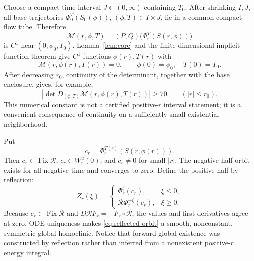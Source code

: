 \documentclass[11pt,reqno]{amsart}
\numberwithin{equation}{section}
\theoremstyle{remark}
\newcommand{\Fix}{\operatorname{Fix}}
\newcommand{\cR}{\mathcal R}
\newcommand{\cM}{\mathcal M}
\begin{document}
Choose a compact time interval $J\Subset(0,\infty)$ containing $T_0$.
After shrinking $I,J$, all base trajectories
$\Phi_0^T(S_0(\phi))$, $(\phi,T)\in I\times J$, lie in a common compact
flow tube.  Therefore
\begin{equation}\label{eq:matching-map}
 \cM(r,\phi,T)=(P,Q)\bigl(\Phi_r^T(S(r,\phi))\bigr)
\end{equation}
is $C^1$ near $(0,\phi_0,T_0)$.  Lemma~\ref{lem:core} and the
finite-dimensional implicit-function theorem give $C^1$ functions
$\phi(r),T(r)$ with
\begin{equation}\label{eq:implicit-branch}
 \cM(r,\phi(r),T(r))=0,
 \qquad \phi(0)=\phi_0,\quad T(0)=T_0.
\end{equation}
After decreasing $r_0$, continuity of the determinant, together with the
base enclosure, gives, for example,
\begin{equation}\label{eq:continued-det-bound}
 \left|\det D_{(\phi,T)}\cM(r,\phi(r),T(r))\right|\ge70
 \qquad(|r|\le r_0).
\end{equation}
This numerical constant is not a certified positive-$r$ interval statement;
it is a convenient consequence of continuity on a sufficiently small
existential neighborhood.

Put
\begin{equation}\label{eq:center-cr}
 c_r=\Phi_r^{T(r)}(S(r,\phi(r))).
\end{equation}
Then $c_r\in\Fix\cR$, $c_r\in W^u_r(0)$, and $c_r\ne0$ for small $|r|$.
The negative half-orbit exists for all negative time and converges to zero.
Define the positive half by reflection:
\begin{equation}\label{eq:reflected-orbit}
 Z_r(\xi)=
 \begin{cases}
  \Phi_r^\xi(c_r),&\xi\le0,\\
  \cR\Phi_r^{-\xi}(c_r),&\xi\ge0.
 \end{cases}
\end{equation}
Because $c_r\in\Fix\cR$ and $D\cR F_r=-F_r\circ\cR$, the values and
first derivatives agree at zero.  ODE uniqueness makes
\eqref{eq:reflected-orbit} a smooth, nonconstant, symmetric global
homoclinic.  Notice that forward global existence was constructed by
reflection rather than inferred from a nonexistent positive-$r$ energy
integral.
\end{document}
